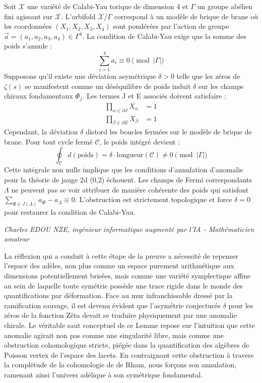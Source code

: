 \documentclass[
]{article}
\begin{document}
Soit $\mathcal{X}$ une variété de Calabi-Yau torique de dimension 4 et $\Gamma$ un groupe abélien fini agissant sur $\mathcal{X}$. L'orbifold $\mathcal{X}/\Gamma$ correspond à un modèle de brique de brane où les coordonnées $(X_1, X_2, X_3, X_4)$ sont pondérées par l'action de groupe $\vec{a} = (a_1, a_2, a_3, a_4) \in \Gamma^4$. La condition de Calabi-Yau exige que la somme des poids s'annule :
\begin{equation*}
\sum_{i=1}^4 a_i \equiv 0 \pmod{|\Gamma|}
\end{equation*}
Supposons qu'il existe une déviation asymétrique $\delta > 0$ telle que les zéros de $\zeta(s)$ se manifestent comme un déséquilibre de poids induit $\delta$ sur les champs chiraux fondamentaux $\Phi_j$. Les termes J et E associés doivent satisfaire :
\begin{align*}
\prod_{\alpha \in \partial J} X_\alpha &= 1 \\
\prod_{\beta \in \partial E} X_\beta &= 1
\end{align*}
Cependant, la déviation $\delta$ distord les boucles fermées sur le modèle de brique de brane. Pour tout cycle fermé $\mathcal{C}$, le poids intégré devient :
\begin{equation*}
\oint_{\mathcal{C}} d(\text{poids}) = \delta \cdot \text{longueur}(\mathcal{C}) \neq 0 \pmod{|\Gamma|}
\end{equation*}
Cette intégrale non nulle implique que les conditions d'annulation d'anomalie pour la théorie de jauge 2d (0,2) échouent. Les champs de Fermi correspondants $\Lambda$ ne peuvent pas se voir attribuer de manière cohérente des poids qui satisfont $\sum_{\Phi \in J(\Lambda)} a_\Phi - a_\Lambda \equiv 0$. L'obstruction est strictement topologique et force $\delta = 0$ pour restaurer la condition de Calabi-Yau.

\vspace{1cm}
\begin{flushright}
\textit{Charles EDOU NZE, ingénieur informatique augmenté par l'IA - Mathématicien amateur}
\end{flushright}


La réflexion qui a conduit à cette étape de la preuve a nécessité de repenser l'espace des adèles, non plus comme un espace purement arithmétique aux dimensions potentiellement brisées, mais comme une variété symplectique affine au sein de laquelle toute symétrie possède une trace rigide dans le monde des quantifications par déformation. Face au mur infranchissable dressé par la ramification sauvage, il est devenu évident que l'asymétrie conjecturée $\delta$ pour les zéros de la fonction Zêta devait se traduire physiquement par une anomalie chirale. Le véritable saut conceptuel de ce Lemme repose sur l'intuition que cette anomalie agirait non pas comme une singularité libre, mais comme une obstruction cohomologique stricte, piégée dans la quantification des algèbres de Poisson vertex de l'espace des lacets. En contraignant cette obstruction à travers la complétude de la cohomologie de de Rham, nous forçons son annulation, ramenant ainsi l'univers adélique à son symétrique fondamental.
\end{document}
